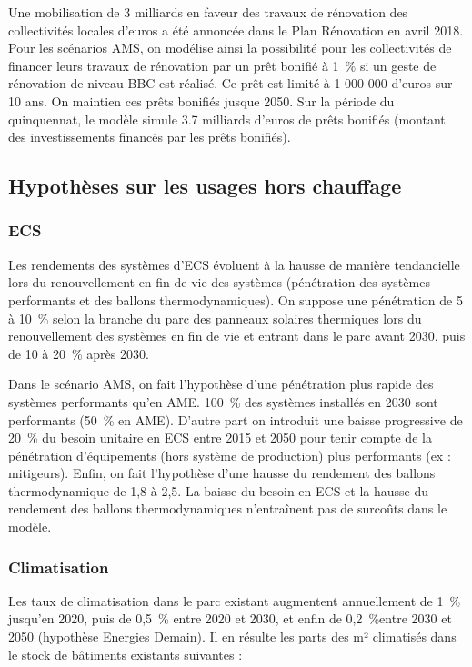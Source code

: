 \documentclass[10.5pt,a4paper]{article}
\begin{document}
{Une mobilisation de 3 milliards en faveur des travaux de rénovation des collectivités locales d’euros a été annoncée dans le Plan Rénovation en avril 2018. Pour les scénarios AMS, on modélise ainsi la possibilité pour les collectivités de financer leurs travaux de rénovation par un prêt bonifié à 1~\% si un geste de rénovation de niveau BBC est réalisé. Ce prêt est limité à 1 000 000 d’euros sur 10 ans. On maintien ces prêts bonifiés jusque 2050. Sur la période du quinquennat, le modèle simule 3.7 milliards d’euros de prêts bonifiés (montant des investissements financés par les prêts bonifiés). 

\subsection{Hypothèses sur les usages hors chauffage}

\subsubsection{ECS}

Les rendements des systèmes d’ECS évoluent à la hausse de manière tendancielle lors du renouvellement en fin de vie des systèmes (pénétration des systèmes performants et des ballons thermodynamiques). On suppose une pénétration de 5 à 10~\% selon la branche du parc des panneaux solaires thermiques lors du renouvellement des systèmes en fin de vie et entrant dans le parc avant 2030, puis de 10 à 20~\% après 2030. 

Dans le scénario AMS, on fait l’hypothèse d’une pénétration plus rapide des systèmes performants qu’en AME. 100~\% des systèmes installés en 2030 sont performants (50~\% en AME). D’autre part on introduit une baisse progressive de 20~\% du besoin unitaire en ECS entre 2015 et 2050 pour tenir compte de la pénétration d’équipements (hors système de production) plus performants (ex : mitigeurs). Enfin, on fait l’hypothèse d’une hausse du rendement des ballons thermodynamique de 1,8 à 2,5. La baisse du besoin en ECS et la hausse du rendement des ballons thermodynamiques n’entraînent pas de surcoûts dans le modèle.

\subsubsection{Climatisation}

Les taux de climatisation dans le parc existant augmentent annuellement de 1~\% jusqu’en 2020, puis de 0,5~\% entre 2020 et 2030, et enfin de 0,2~\%entre 2030 et 2050 (hypothèse Energies Demain). Il en résulte les parts des m² climatisés dans le stock de bâtiments existants suivantes :

}
\end{document}
